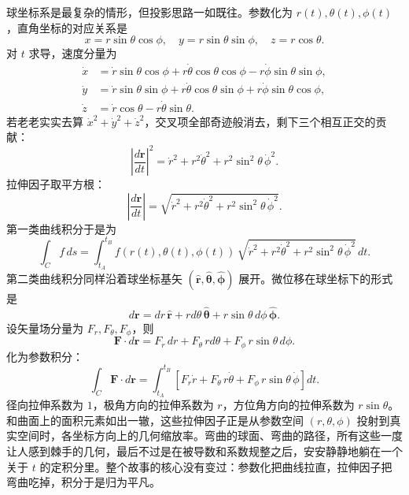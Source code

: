 \documentclass[UTF8]{ctexbook}
\begin{document}
球坐标系是最复杂的情形，但投影思路一如既往。参数化为 $r(t), \theta(t), \phi(t)$，直角坐标的对应关系是
\[
x = r \sin\theta \cos\phi, \quad
y = r \sin\theta \sin\phi, \quad
z = r \cos\theta.
\]
对 $t$ 求导，速度分量为
\[
\begin{aligned}
\dot{x} &= \dot{r} \sin\theta \cos\phi + r \dot{\theta} \cos\theta \cos\phi - r \dot{\phi} \sin\theta \sin\phi, \\
\dot{y} &= \dot{r} \sin\theta \sin\phi + r \dot{\theta} \cos\theta \sin\phi + r \dot{\phi} \sin\theta \cos\phi, \\
\dot{z} &= \dot{r} \cos\theta - r \dot{\theta} \sin\theta.
\end{aligned}
\]
若老老实实去算 $\dot{x}^2 + \dot{y}^2 + \dot{z}^2$，交叉项全部奇迹般消去，剩下三个相互正交的贡献：
\[
\left|\frac{d\mathbf{r}}{dt}\right|^2 = \dot{r}^2 + r^2 \dot{\theta}^2 + r^2 \sin^2\theta \, \dot{\phi}^2.
\]
拉伸因子取平方根：
\[
\left|\frac{d\mathbf{r}}{dt}\right| = \sqrt{\dot{r}^2 + r^2 \dot{\theta}^2 + r^2 \sin^2\theta \, \dot{\phi}^2}.
\]
第一类曲线积分于是为
\[
\int_C f \, ds = \int_{t_A}^{t_B} f(r(t), \theta(t), \phi(t)) \, \sqrt{\dot{r}^2 + r^2 \dot{\theta}^2 + r^2 \sin^2\theta \, \dot{\phi}^2} \, dt.
\]
第二类曲线积分同样沿着球坐标基矢 $(\hat{\mathbf{r}}, \hat{\boldsymbol{\theta}}, \hat{\boldsymbol{\phi}})$ 展开。微位移在球坐标下的形式是
\[
d\mathbf{r} = dr \, \hat{\mathbf{r}} + r d\theta \, \hat{\boldsymbol{\theta}} + r \sin\theta \, d\phi \, \hat{\boldsymbol{\phi}}.
\]
设矢量场分量为 $F_r, F_\theta, F_\phi$，则
\[
\mathbf{F} \cdot d\mathbf{r} = F_r \, dr + F_\theta \, r d\theta + F_\phi \, r \sin\theta \, d\phi.
\]
化为参数积分：
\[
\int_C \mathbf{F} \cdot d\mathbf{r} = \int_{t_A}^{t_B} \left[ F_r \dot{r} + F_\theta \, r \dot{\theta} + F_\phi \, r \sin\theta \, \dot{\phi} \right] dt.
\]
径向拉伸系数为 $1$，极角方向的拉伸系数为 $r$，方位角方向的拉伸系数为 $r \sin\theta$。和曲面上的面积元素如出一辙，这些拉伸因子正是从参数空间 $(r,\theta,\phi)$ 投射到真实空间时，各坐标方向上的几何缩放率。弯曲的球面、弯曲的路径，所有这些一度让人感到棘手的几何，最后不过是在被导数和系数规整之后，安安静静地躺在一个关于 $t$ 的定积分里。整个故事的核心没有变过：参数化把曲线拉直，拉伸因子把弯曲吃掉，积分于是归为平凡。
\end{document}
